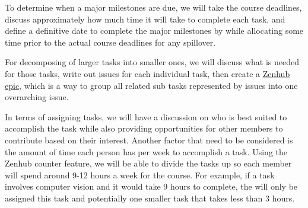 \documentclass[12pt,letterpaper]{article}
\begin{document}
To determine when a major milestones are due, we will take the course deadlines,
discuss approximately how much time it will take to complete each task, and
define a definitive date to complete the major milestones by while allocating
some time prior to the actual course deadlines for any spillover.

For decomposing of larger tasks into smaller ones, we will discuss what is
needed for those tasks, write out issues for each individual task, then create a
\href{https://blog.zenhub.com/working-with-epics-in-github/}{Zenhub epic}, which
is a way to group all related sub tasks represented by issues into one
overarching issue.

In terms of assigning tasks, we will have a discussion on who is best suited to
accomplish the task while also providing opportunities for other members to
contribute based on their interest. Another factor that need to be considered is
the amount of time each person has per week to accomplish a task. Using the
Zenhub counter feature, we will be able to divide the tasks up so each member
will spend around 9-12 hours a week for the course. For example, if a task
involves computer vision and it would take 9 hours to complete, the
 will only be assigned this task and potentially one smaller
task that takes less than 3 hours.
\end{document}
